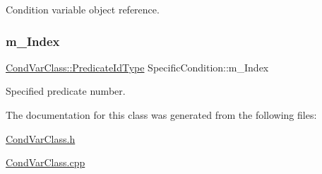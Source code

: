Condition variable object reference. 

\mbox{\label{classSpecificCondition_a9de96adba4d7b9347d2ae60a49b57d9b}} 
\subsubsection{\texorpdfstring{m\+\_\+\+Index}{m\_Index}}
{\footnotesize\ttfamily \hyperlink{classCondVarClass_a8e27f99972b8b95f064d6657a4583a5b}{Cond\+Var\+Class\+::\+Predicate\+Id\+Type} Specific\+Condition\+::m\+\_\+\+Index\hspace{0.3cm}{\ttfamily [protected]}}



Specified predicate number. 



The documentation for this class was generated from the following files\+:\begin{DoxyCompactItemize}
\item 
\hyperlink{CondVarClass_8h}{Cond\+Var\+Class.\+h}\item 
\hyperlink{CondVarClass_8cpp}{Cond\+Var\+Class.\+cpp}\end{DoxyCompactItemize}
